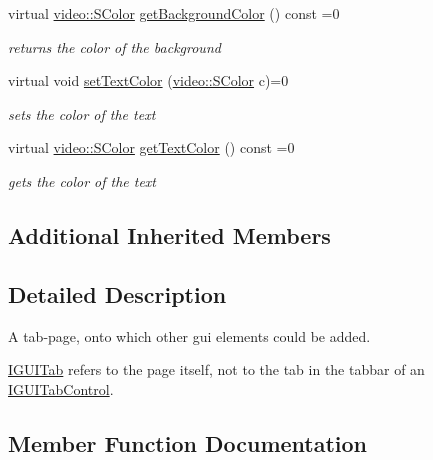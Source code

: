 \begin{DoxyCompactItemize}
virtual \hyperlink{classirr_1_1video_1_1SColor}{video\+::\+S\+Color} \hyperlink{classirr_1_1gui_1_1IGUITab_ab9c9bd6b40bf90482d429d9a87f7e06c}{get\+Background\+Color} () const =0
\begin{DoxyCompactList}\small\item\em returns the color of the background \end{DoxyCompactList}\item 
\mbox{\label{classirr_1_1gui_1_1IGUITab_a56f7e206931506705b3a54674d6b8603}} 
virtual void \hyperlink{classirr_1_1gui_1_1IGUITab_a56f7e206931506705b3a54674d6b8603}{set\+Text\+Color} (\hyperlink{classirr_1_1video_1_1SColor}{video\+::\+S\+Color} c)=0
\begin{DoxyCompactList}\small\item\em sets the color of the text \end{DoxyCompactList}\item 
\mbox{\label{classirr_1_1gui_1_1IGUITab_a91cd857c91bbbbe9a216adadf9ea3b8f}} 
virtual \hyperlink{classirr_1_1video_1_1SColor}{video\+::\+S\+Color} \hyperlink{classirr_1_1gui_1_1IGUITab_a91cd857c91bbbbe9a216adadf9ea3b8f}{get\+Text\+Color} () const =0
\begin{DoxyCompactList}\small\item\em gets the color of the text \end{DoxyCompactList}\end{DoxyCompactItemize}
\subsection*{Additional Inherited Members}


\subsection{Detailed Description}
A tab-\/page, onto which other gui elements could be added. 

\hyperlink{classirr_1_1gui_1_1IGUITab}{I\+G\+U\+I\+Tab} refers to the page itself, not to the tab in the tabbar of an \hyperlink{classirr_1_1gui_1_1IGUITabControl}{I\+G\+U\+I\+Tab\+Control}. 

\subsection{Member Function Documentation}
\mbox{\label{classirr_1_1gui_1_1IGUITab_aedc76f9d93782188741ace78b32634f0}} 
